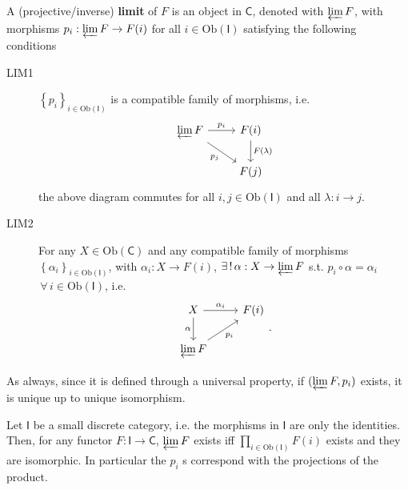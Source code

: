 \begin{defn}
	A (projective/inverse) \textbf{limit} of $F$ is an object in $\mathsf{C}$, denoted with $\varprojlim F$, with morphisms
	$p_i: \varprojlim F \to F(i)$ for all $i \in \mathrm{Ob} \left(\mathsf{I}\right)$ satisfying the following conditions
	\begin{description}
		\item[LIM1] $\left\{ p_i \right\}_{i \in \mathrm{Ob} \left(\mathsf{I}\right)}$ is a compatible family of morphisms, i.e.
			\begin{equation}
			\begin{tikzcd}
				\varprojlim F \arrow[r, "p_i", rightarrow] \arrow[rd, "p_j"', rightarrow] &
				F(i) \arrow[d, "F(\lambda)", rightarrow] \\
				&
				F(j)
			\end{tikzcd}
			\end{equation} 
			the above diagram commutes for all $i, j \in \mathrm{Ob} \left(\mathsf{I}\right)$ and all $\lambda: i \to j$.
		\item[LIM2] For any $X \in \mathrm{Ob} \left(\mathsf{C}\right)$ and any compatible family of morphisms $\left\{ \alpha_i \right\}_{i \in \mathrm{Ob} \left(\mathsf{I}\right)}$, with $\alpha_i: X \to F(i)$, 
			$\exists\, !\, \alpha: X \to \varprojlim F$ s.t. $p_i \circ \alpha = \alpha_i$ $\,\forall\, i \in \mathrm{Ob} \left(\mathsf{I}\right)$, i.e.
			\begin{equation}
			\begin{tikzcd}
				X \arrow[r, "\alpha_i", rightarrow] \arrow[d, "\alpha"', rightarrow] &
				F(i)\\
				\varprojlim F \arrow[ru, "p_i"', rightarrow]  
			\end{tikzcd}
			.\end{equation} 
	\end{description} 
\end{defn}

\begin{rem}
	As always, since it is defined through a universal property, if $(\varprojlim F, p_i)$ exists, it is unique up to unique isomorphism.
\end{rem}

\begin{ex}
	Let $\mathsf{I}$ be a small discrete category, i.e. the morphisms in $\mathsf{I}$ are only the identities.
	Then, for any functor $F: \mathsf{I} \to \mathsf{C}$, $\varprojlim F$ exists iff 
	$\prod_{i \in \mathrm{Ob} \left(\mathsf{I}\right)} F(i)$ exists and they are isomorphic.
	In particular the $p_i$ s correspond with the projections of the product.
\end{ex} 

